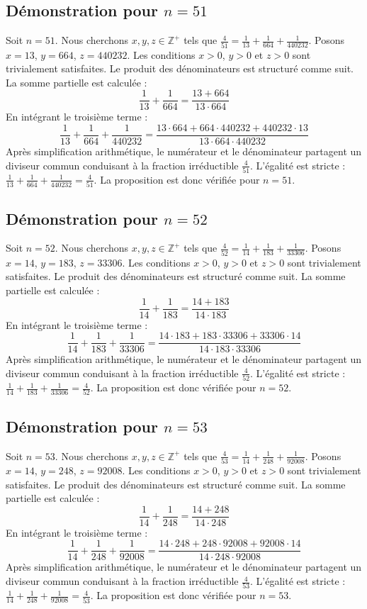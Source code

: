 \documentclass[11pt,a4paper]{article}
\begin{document}
\subsection{Démonstration pour $n = 51$}
Soit $n = 51$. Nous cherchons $x, y, z \in \mathbb{Z}^{+}$ tels que $\frac{4}{51} = \frac{1}{13} + \frac{1}{664} + \frac{1}{440232}$.
Posons $x = 13$, $y = 664$, $z = 440232$.
Les conditions $x > 0$, $y > 0$ et $z > 0$ sont trivialement satisfaites.
Le produit des dénominateurs est structuré comme suit. La somme partielle est calculée :
$$ \frac{1}{13} + \frac{1}{664} = \frac{13+664}{13 \cdot 664} $$
En intégrant le troisième terme :
$$ \frac{1}{13} + \frac{1}{664} + \frac{1}{440232} = \frac{13 \cdot 664 + 664 \cdot 440232 + 440232 \cdot 13}{13 \cdot 664 \cdot 440232} $$
Après simplification arithmétique, le numérateur et le dénominateur partagent un diviseur commun conduisant à la fraction irréductible $\frac{4}{51}$.
L'égalité est stricte : $\frac{1}{13} + \frac{1}{664} + \frac{1}{440232} = \frac{4}{51}$.
La proposition est donc vérifiée pour $n = 51$.
\subsection{Démonstration pour $n = 52$}
Soit $n = 52$. Nous cherchons $x, y, z \in \mathbb{Z}^{+}$ tels que $\frac{4}{52} = \frac{1}{14} + \frac{1}{183} + \frac{1}{33306}$.
Posons $x = 14$, $y = 183$, $z = 33306$.
Les conditions $x > 0$, $y > 0$ et $z > 0$ sont trivialement satisfaites.
Le produit des dénominateurs est structuré comme suit. La somme partielle est calculée :
$$ \frac{1}{14} + \frac{1}{183} = \frac{14+183}{14 \cdot 183} $$
En intégrant le troisième terme :
$$ \frac{1}{14} + \frac{1}{183} + \frac{1}{33306} = \frac{14 \cdot 183 + 183 \cdot 33306 + 33306 \cdot 14}{14 \cdot 183 \cdot 33306} $$
Après simplification arithmétique, le numérateur et le dénominateur partagent un diviseur commun conduisant à la fraction irréductible $\frac{4}{52}$.
L'égalité est stricte : $\frac{1}{14} + \frac{1}{183} + \frac{1}{33306} = \frac{4}{52}$.
La proposition est donc vérifiée pour $n = 52$.
\subsection{Démonstration pour $n = 53$}
Soit $n = 53$. Nous cherchons $x, y, z \in \mathbb{Z}^{+}$ tels que $\frac{4}{53} = \frac{1}{14} + \frac{1}{248} + \frac{1}{92008}$.
Posons $x = 14$, $y = 248$, $z = 92008$.
Les conditions $x > 0$, $y > 0$ et $z > 0$ sont trivialement satisfaites.
Le produit des dénominateurs est structuré comme suit. La somme partielle est calculée :
$$ \frac{1}{14} + \frac{1}{248} = \frac{14+248}{14 \cdot 248} $$
En intégrant le troisième terme :
$$ \frac{1}{14} + \frac{1}{248} + \frac{1}{92008} = \frac{14 \cdot 248 + 248 \cdot 92008 + 92008 \cdot 14}{14 \cdot 248 \cdot 92008} $$
Après simplification arithmétique, le numérateur et le dénominateur partagent un diviseur commun conduisant à la fraction irréductible $\frac{4}{53}$.
L'égalité est stricte : $\frac{1}{14} + \frac{1}{248} + \frac{1}{92008} = \frac{4}{53}$.
La proposition est donc vérifiée pour $n = 53$.
\end{document}
